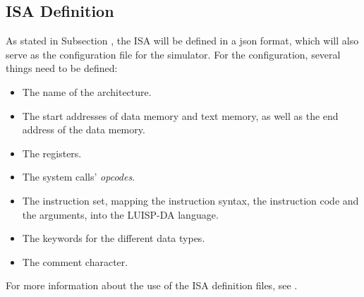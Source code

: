 \subsection{ISA Definition}\label{subsec:isa-design}
As stated in Subsection , the \gls{ISA} will be defined in a \gls{json} format, which will also serve as the configuration file for the simulator. For the configuration, several things need to be defined:
\begin{itemize}
  \item The name of the architecture.
  \item The start addresses of \gls{data memory} and \gls{text memory}, as well as the end address of the \gls{data memory}.
  \item The \glspl{register}.
  \item The \glspl{system call}' \textit{opcodes}.
  \item The instruction set, mapping the  instruction syntax, the instruction code and the arguments, into the LUISP-DA language.
  \item The keywords for the different data types.
  \item The comment character.
\end{itemize}

\noindent
For more information about the use of the \gls{ISA} definition files, see .


